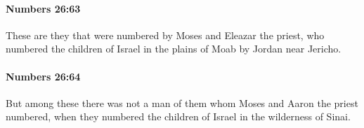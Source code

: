 		\paragraph{Numbers 26:63} %
			\label{NUMBERS-26-63}

			These are they that were numbered by Moses and Eleazar the priest, who numbered the children of Israel in the plains of Moab by Jordan near Jericho.


		\paragraph{Numbers 26:64} %
			\label{NUMBERS-26-64}

			But among these there was not a man of them whom Moses and Aaron the priest numbered, when they numbered the children of Israel in the wilderness of Sinai.


